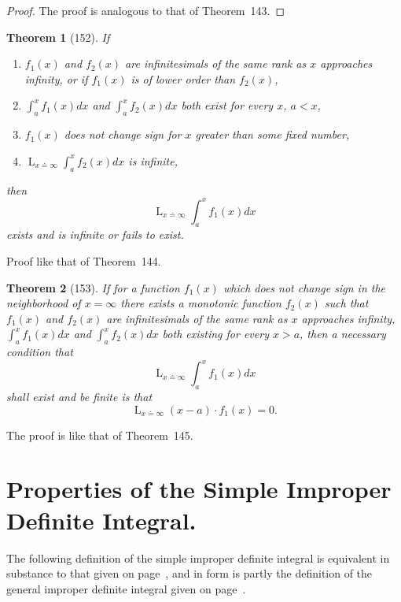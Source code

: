 \documentclass[a4paper,12pt]{book}[2004/02/16]
\providecommand{\hyperlink}[2]{#2}
\providecommand{\hypertarget}[2]{#2}
\theoremstyle{ilemma}
\theoremstyle{itheorem}
\newtheorem{theorem}{Theorem}
\theoremstyle{iother}
\theoremstyle{icorollary}
\theoremstyle{numcorollary}
\theoremstyle{idefinition}
\begin{document}
\begin{proof}
The proof is analogous to that of Theorem~\hyperlink{thm143}{143}.
\end{proof}

\begin{theorem}[152]\hypertarget{thm152}{}
If
\begin{enumerate}
\item[\textnormal{(1)}] $f_1(x)$ and $f_2(x)$ are infinitesimals of the same rank
as $x$ approaches infinity, or if $f_1(x)$ is of lower order than
$f_2(x)$,

\item[\textnormal{(2)}] $\displaystyle \int_a^xf_1(x)dx$ and $\displaystyle
\int_a^xf_2(x)dx$ both exist for every $x$, $a<x$,

\item[\textnormal{(3)}] $f_1(x)$ does not change sign for $x$ greater than some
fixed number,

\item[\textnormal{(4)}] $\displaystyle \mathop{L}_{x\doteq \infty}\int_a^xf_2(x)dx$
is infinite,
\end{enumerate}
then
\[
  \mathop{L}_{x\doteq \infty}\int_a^xf_1(x)dx
\]
exists and is infinite or fails to exist.
\end{theorem}

Proof like that of Theorem~\hyperlink{thm144}{144}.

\begin{theorem}[153]\hypertarget{thm153}{}
If for a function $f_1(x)$ which does not change sign in the
neighborhood of $x=\infty$ there exists a monotonic function $f_2(x)$
such that $f_1(x)$ and $f_2(x)$ are infinitesimals of the same
rank as $x$ approaches infinity, $\displaystyle \int_a^xf_1(x)dx$ and
$\displaystyle \int_a^xf_2(x)dx$ both existing for every $x>a$, then a
necessary condition that
\[
  \mathop{L}_{x\doteq \infty}\int_a^xf_1(x)dx
\]
shall exist and be finite is that
\[
  \mathop{L}_{x\doteq \infty}(x-a)\cdot f_1(x)=0.
\]
\end{theorem}

The proof is like that of Theorem~\hyperlink{thm145}{145}.

\section{Properties of the Simple Improper Definite Integral.}\hypertarget{chIXsec3}{}%
The following definition of the simple improper definite integral is
equivalent in substance to that given on page~\pageref{dp192}, and in
form is partly the definition of the general improper definite
integral given on page~\pageref{s3p210}.
\end{document}
